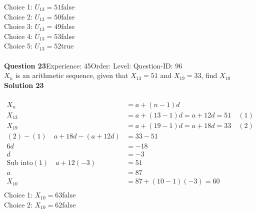 \documentclass{article}
\begin{document}
Choice 1: \hspace{20pt}$U_{13}=51$\hspace{20pt}false\\
Choice 2: \hspace{20pt}$U_{13}=50$\hspace{20pt}false\\
Choice 3: \hspace{20pt}$U_{13}=49$\hspace{20pt}false\\
Choice 4: \hspace{20pt}$U_{13}=53$\hspace{20pt}false\\
Choice 5: \hspace{20pt}$U_{13}=52$\hspace{20pt}true\\
\\[4pt]
\noindent\textbf{Question 23}\hspace{20pt}Experience: 45\hspace{20pt}Order: \hspace{20pt}Level: \hspace{20pt}Question-ID: 96\\[2pt]
$X_n$ is an arithmetic sequence, given that $X_{13}=51$ and $X_{19}=33$, find $X_{10}$\\[4pt]
\noindent\textbf{Solution 23}\\[2pt]
\\[-35pt]\begin{align*}
X_n&=a+(n-1)d\\[2pt]
X_{13}&=a+(13-1)d=a+12d=51\quad (1)\\[2pt]
X_{19}&=a+(19-1)d=a+18d=33\quad (2)\\[2pt]
(2)-(1)\quad a+18d-(a+12d)&=33-51\\[2pt]
6d&=-18\\[2pt]
d&=-3\\[12pt]
\text{Sub into} (1) \quad a+12(-3)&=51\\[2pt]
a&=87\\[12pt]
X_{10}&=87+(10-1)(-3)=60\\[-40pt]
\end{align*}
Choice 1: \hspace{20pt}$X_{10}=63$\hspace{20pt}false\\
Choice 2: \hspace{20pt}$X_{10}=62$\hspace{20pt}false\\
\end{document}
